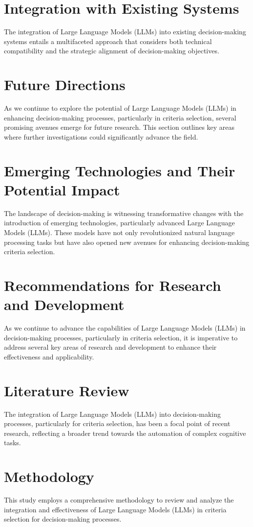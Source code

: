 \documentclass{article}
\begin{document}
\section{Integration with Existing Systems}
The integration of Large Language Models (LLMs) into existing decision-making systems entails a multifaceted approach that considers both technical compatibility and the strategic alignment of decision-making objectives.

\section{Future Directions}
As we continue to explore the potential of Large Language Models (LLMs) in enhancing decision-making processes, particularly in criteria selection, several promising avenues emerge for future research. This section outlines key areas where further investigations could significantly advance the field.

\section{Emerging Technologies and Their Potential Impact}
The landscape of decision-making is witnessing transformative changes with the introduction of emerging technologies, particularly advanced Large Language Models (LLMs). These models have not only revolutionized natural language processing tasks but have also opened new avenues for enhancing decision-making criteria selection.

\section{Recommendations for Research and Development}
As we continue to advance the capabilities of Large Language Models (LLMs) in decision-making processes, particularly in criteria selection, it is imperative to address several key areas of research and development to enhance their effectiveness and applicability.

\section{Literature Review}
The integration of Large Language Models (LLMs) into decision-making processes, particularly for criteria selection, has been a focal point of recent research, reflecting a broader trend towards the automation of complex cognitive tasks.

\section{Methodology}
This study employs a comprehensive methodology to review and analyze the integration and effectiveness of Large Language Models (LLMs) in criteria selection for decision-making processes.
\end{document}

